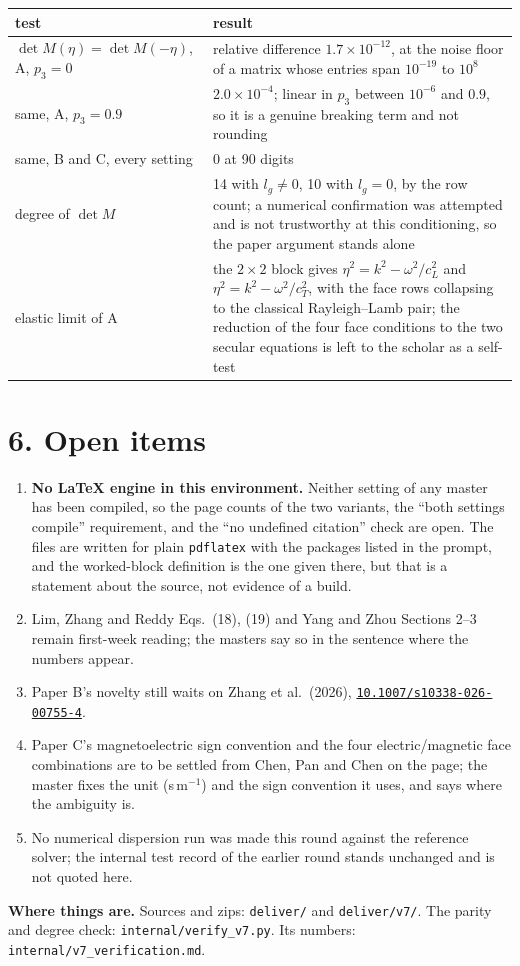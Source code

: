\documentclass[11pt]{article}
\newcommand{\doi}[1]{\href{https://doi.org/#1}{\texttt{#1}}}
\begin{document}
\begin{center}
\begin{tabular}{p{6.6cm}p{6.6cm}}
\toprule
test & result\\
\midrule
$\det M(\eta)=\det M(-\eta)$, A, $p_3=0$ & relative difference $1.7\times10^{-12}$, at the noise floor of a
matrix whose entries span $10^{-19}$ to $10^{8}$\\
same, A, $p_3=0.9$ & $2.0\times10^{-4}$; linear in $p_3$ between $10^{-6}$ and $0.9$, so it is a genuine
breaking term and not rounding\\
same, B and C, every setting & $0$ at 90 digits\\
degree of $\det M$ & 14 with $l_g\ne0$, 10 with $l_g=0$, by the row count; a numerical confirmation was
attempted and is not trustworthy at this conditioning, so the paper argument stands alone\\
elastic limit of A & the $2\times2$ block gives $\eta^2=k^2-\omega^2/c_L^2$ and $\eta^2=k^2-\omega^2/c_T^2$,
with the face rows collapsing to the classical Rayleigh--Lamb pair; the reduction of the four face
conditions to the two secular equations is left to the scholar as a self-test\\
\bottomrule
\end{tabular}
\end{center}

\section*{6. Open items}

\begin{enumerate}\setlength{\itemsep}{2pt}
\item \textbf{No LaTeX engine in this environment.} Neither setting of any master has been compiled, so the
page counts of the two variants, the ``both settings compile'' requirement, and the ``no undefined
citation'' check are open. The files are written for plain \texttt{pdflatex} with the packages listed in the
prompt, and the worked-block definition is the one given there, but that is a statement about the source,
not evidence of a build.
\item Lim, Zhang and Reddy Eqs.~(18), (19) and Yang and Zhou Sections 2--3 remain first-week reading; the
masters say so in the sentence where the numbers appear.
\item Paper B's novelty still waits on Zhang et al.\ (2026), \doi{10.1007/s10338-026-00755-4}.
\item Paper C's magnetoelectric sign convention and the four electric/magnetic face combinations are to be
settled from Chen, Pan and Chen on the page; the master fixes the unit (s\,m$^{-1}$) and the sign
convention it uses, and says where the ambiguity is.
\item No numerical dispersion run was made this round against the reference solver; the internal test
record of the earlier round stands unchanged and is not quoted here.
\end{enumerate}

\noindent\textbf{Where things are.} Sources and zips: \texttt{deliver/} and \texttt{deliver/v7/}. The parity
and degree check: \texttt{internal/verify\_v7.py}. Its numbers: \texttt{internal/v7\_verification.md}.
\end{document}
